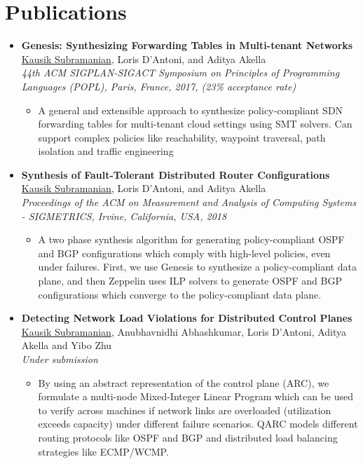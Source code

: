 \documentclass[11pt,a4paper,sans]{moderncv}        %
\begin{document}
\vspace*{1pt}

\section{Publications}
\begin{itemize}
	\item \textbf{Genesis: Synthesizing Forwarding Tables in Multi-tenant Networks} \\
	\underline{Kausik Subramanian}, Loris D’Antoni, and Aditya Akella \\
	\emph{44th ACM SIGPLAN-SIGACT Symposium on Principles of Programming Languages (POPL), Paris, France, 2017, (23\% acceptance rate)}
	\begin{itemize}
		\item A general and extensible approach to synthesize policy-compliant
		SDN forwarding tables for multi-tenant cloud settings using SMT solvers.
		Can support complex policies like reachability, waypoint traversal, path
		isolation and traffic engineering
	\end{itemize}
	\vspace*{4mm}

	\item \textbf{Synthesis of Fault-Tolerant Distributed Router
		Configurations} \\
\underline{Kausik Subramanian}, Loris D’Antoni, and Aditya Akella \\
	\emph{Proceedings of the ACM on Measurement and Analysis of Computing Systems - SIGMETRICS, Irvine, California, USA, 2018}
	\begin{itemize}
		\item A two phase synthesis algorithm for generating policy-compliant
		OSPF and BGP configurations which comply with high-level policies, even
		under failures. First, we use Genesis to synthesize a policy-compliant
		data plane, and then Zeppelin uses ILP solvers to generate OSPF and BGP
		configurations which converge to the policy-compliant data plane.
	\end{itemize}
	\vspace*{4mm}

	
	\item \textbf{Detecting Network Load Violations for Distributed Control Planes} \\
	\underline{Kausik Subramanian}, Anubhavnidhi Abhashkumar, Loris D’Antoni, Aditya Akella and Yibo Zhu \\
	\emph{Under submission}
	\begin{itemize}
		\item By using an abstract representation of the control plane (ARC), we
		formulate a multi-node Mixed-Integer Linear Program which can be used to
		verify across machines if network links are overloaded (utilization
		exceeds capacity) under different failure scenarios. QARC models
		different routing protocols like OSPF and BGP and distributed load
		balancing strategies like ECMP/WCMP.
	\end{itemize}
	\vspace*{4mm}


\end{itemize}
\end{document}
